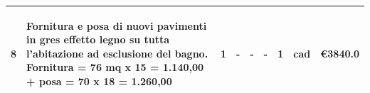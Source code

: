 \documentclass[a4paper]{article}
\begin{document}
\begin{tabular}{ | L{6.1mm} |  L{52.4mm} |  L{7mm} | L{7mm} | L{7mm} | L{7mm} | L{8mm} | L{8mm} | L{16mm} |   }
                        \vspace{2.5mm}\begin{spacing}{0}8\end{spacing} &\vspace{2.5mm}\begin{spacing}{0}Fornitura e posa di nuovi pavimenti in gres effetto legno su tutta l'abitazione ad esclusione del bagno. Fornitura = 76 mq x 15 = 1.140,00 + posa = 70 x 18 = 1.260,00\end{spacing} &\vspace{2.5mm}\begin{spacing}{0}1\end{spacing} &\vspace{2.5mm}\begin{spacing}{0}-\end{spacing} &\vspace{2.5mm}\begin{spacing}{0}-\end{spacing} &\vspace{2.5mm}\begin{spacing}{0}-\end{spacing} &\vspace{2.5mm}\begin{spacing}{0}1\end{spacing} &\vspace{2.5mm}\begin{spacing}{0}cad\end{spacing} &\vspace{2.5mm}\begin{spacing}{0}\euro\hfill  3840.0
                        \end{spacing} \\ \hline %


\end{tabular}
\end{document}
